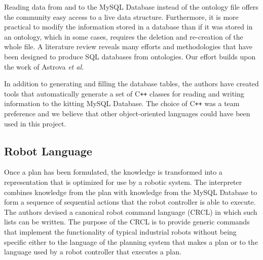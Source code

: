Reading data from and to the \textsf{MySQL Database} instead of the ontology file offers the community easy access to a live data structure. Furthermore, it is more practical to modify the information stored in a database than if it was stored in an ontology, which in some cases, requires the deletion and re-creation of the whole file. A literature review reveals many efforts and methodologies that have been designed to produce SQL databases from ontologies. Our effort builds upon the work of Astrova \textit{et al.} \cite{Astrova2007}

In addition to generating and filling the database tables, the authors have created tools that automatically generate a set of C{}\texttt{++} classes for reading and writing
information to the kitting \textsf{MySQL Database}. The choice of C{}\texttt{++} was a team preference and we believe that other object-oriented languages could have been used in this project.

\subsection{Robot Language}
\label{subsection:robot_language}
Once a plan has been formulated, the knowledge is transformed into a representation that is optimized for use by a robotic system. The interpreter combines knowledge from the plan with knowledge from the \textsf{MySQL Database} to form a sequence of sequential actions that the robot controller is able to execute. The authors devised a canonical robot command language (CRCL) in which such lists can be written. The purpose of the CRCL is to provide generic commands that implement the functionality of typical industrial robots without being specific either to the language of the planning system that makes a plan or to the language used by a robot controller that executes a plan. 